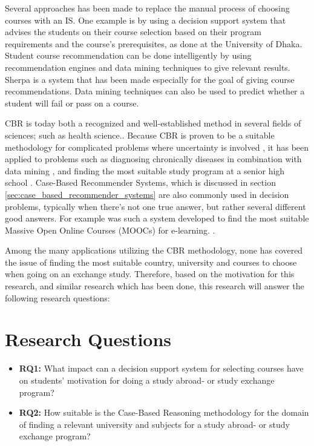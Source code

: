 Several approaches has been made to replace the manual process of choosing courses with an IS. One example is by using a decision support system that advises the students on their course selection based on their program requirements and the course's prerequisites, as done at the University of Dhaka\cite{roushan2014university}. Student course recommendation can be done intelligently by using recommendation engines and data mining techniques to give relevant results. Sherpa\cite{bramucci2012sherpa} is a system that has been made especially for the goal of giving course recommendations. Data mining techniques can also be used to predict whether a student will fail or pass on a course\cite{vialardi2009recommendation}.

CBR is today both a recognized and well-established method in several fields of sciences; such as health science.\cite{begum2011case}. Because CBR is proven to be a suitable methodology for complicated problems where uncertainty is involved \cite{richter2013case}, it has been applied to problems such as diagnosing chronically diseases in combination with data mining \cite{huang2007integrating}, and finding the most suitable study program at a senior high school \cite{mulyana2015case}. Case-Based Recommender Systems, which is discussed in section \ref{sec:case_based_recommender_systems} are also commonly used in decision problems, typically when there's not one true answer, but rather several different good answers. For example was such a system developed to find the most suitable Massive Open Online Courses (MOOCs) for e-learning. \cite{bousbahi2015mooc}. 

Among the many applications utilizing the CBR methodology, none has covered the issue of finding the most suitable country, university and courses to choose when going on an exchange study. Therefore, based on the motivation for this research, and similar research which has been done, this research will answer the following research questions:

\section{Research Questions}

\begin{itemize}
    \item \textbf{RQ1:} What impact can a decision support system for selecting courses have on students' motivation for doing a study abroad- or study exchange program?
    \item \textbf{RQ2:} How suitable is the Case-Based Reasoning methodology for the domain of finding a relevant university and subjects for a study abroad- or study exchange program?
    
\end{itemize}

